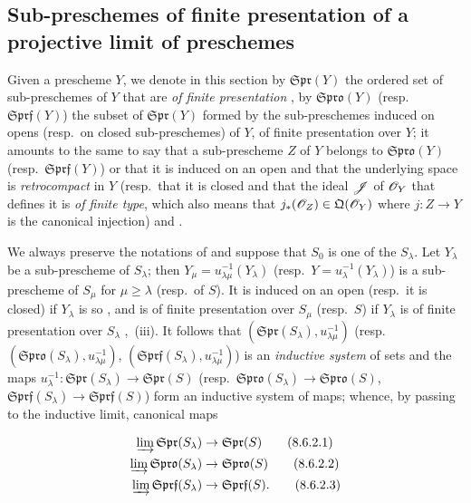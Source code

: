 \subsection{Sub-preschemes of finite presentation of a projective limit of preschemes}
\label{subsection:IV.8.6}

\begin{env}[8.6.1]
\label{IV.8.6.1}
Given a prescheme $Y$, we denote in this section by $\mathfrak{Spr}(Y)$ the ordered set
 of sub-preschemes of $Y$ that are \emph{of finite presentation}
, by $\mathfrak{Spro}(Y)$ (resp.\ $\mathfrak{Sprf}(Y)$) the subset of $\mathfrak{Spr}(Y)$ formed by the sub-preschemes induced on opens (resp.\ on closed sub-preschemes) of $Y$, of finite presentation over $Y$; it amounts to the same to say that a sub-prescheme $Z$ of $Y$ belongs to $\mathfrak{Spro}(Y)$ (resp.\ $\mathfrak{Sprf}(Y)$) or that it is induced on an open and that the underlying space is \emph{retrocompact} in $Y$ (resp.\ that it is closed and that the ideal $\mathscr{J}$ of $\mathscr{O}_Y$ that defines it is \emph{of finite type}, which also means that $j_*(\mathscr{O}_Z)\in\mathfrak{Q}(\mathscr{O}_Y)$ where $j:Z\to Y$ is the canonical injection)  and .
\end{env}

\begin{env}[8.6.2]
\label{IV.8.6.2}
We always preserve the notations of  and suppose that $S_0$ is one of the $S_\lambda$.
Let $Y_\lambda$ be a sub-prescheme of $S_\lambda$; then $Y_\mu=u_{\lambda\mu}^{-1}(Y_\lambda)$ (resp.\ $Y=u_\lambda^{-1}(Y_\lambda)$) is a sub-prescheme of $S_\mu$ for $\mu\geqslant\lambda$ (resp.\ of $S$). It is induced on an open (resp.\ it is closed) if $Y_\lambda$ is so , and is of finite presentation over $S_\mu$ (resp.\ $S$) if $Y_\lambda$ is of finite presentation over $S_\lambda$ ,~(iii). It follows that $(\mathfrak{Spr}(S_\lambda),u_{\lambda\mu}^{-1})$ (resp.\ $(\mathfrak{Spro}(S_\lambda),u_{\lambda\mu}^{-1})$, $(\mathfrak{Sprf}(S_\lambda),u_{\lambda\mu}^{-1})$) is an \emph{inductive system} of sets and the maps $u_\lambda^{-1}:\mathfrak{Spr}(S_\lambda)\to\mathfrak{Spr}(S)$ (resp.\ $\mathfrak{Spro}(S_\lambda)\to\mathfrak{Spro}(S)$, $\mathfrak{Sprf}(S_\lambda)\to\mathfrak{Sprf}(S)$) form an inductive system of maps; whence, by passing to the inductive limit, canonical maps
\end{env}

\begin{align}
  \varinjlim \mathfrak{Spr}(S_\lambda) &\to \mathfrak{Spr}(S) \tag{8.6.2.1}\label{IV.8.6.2.1}\\
  \varinjlim \mathfrak{Spro}(S_\lambda) &\to \mathfrak{Spro}(S) \tag{8.6.2.2}\label{IV.8.6.2.2}\\
  \varinjlim \mathfrak{Sprf}(S_\lambda) &\to \mathfrak{Sprf}(S). \tag{8.6.2.3}\label{IV.8.6.2.3}
\end{align}

